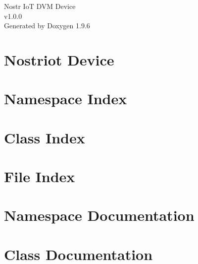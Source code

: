 \documentclass[twoside]{book}
\newcommand{\+}{\discretionary{\mbox{\scriptsize$\hookleftarrow$}}{}{}}
\newcommand{\clearemptydoublepage}{%
    \newpage{\pagestyle{empty}\cleardoublepage}%
  }
\begin{document}
  \raggedbottom
    \hypersetup{pageanchor=false,
                bookmarksnumbered=true,
                pdfencoding=unicode
               }
  \begin{titlepage}
  \vspace*{7cm}
  \begin{center}%
  {\Large Nostr Io\+T DVM Device}\\
  [1ex]\large v1.\+0.\+0 \\
  \vspace*{1cm}
  {\large Generated by Doxygen 1.9.6}\\
  \end{center}
  \end{titlepage}
  \clearemptydoublepage
  \tableofcontents
  \clearemptydoublepage
  \hypersetup{pageanchor=true}
\chapter{Nostriot Device}
\label{index}\hypertarget{index}{}
\chapter{Namespace Index}

\chapter{Class Index}

\chapter{File Index}

\chapter{Namespace Documentation}












\chapter{Class Documentation}







\end{document}
